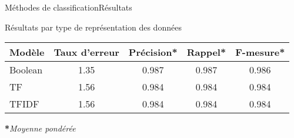 \begin{frame}{Méthodes de classification}{Résultats}
  
  Résultats par type de représentation des données
  
  \begin{center}
    \scriptsize
    \begin{tabular}{l cccc} 
      \hline
      \textbf{Modèle} & \textbf{Taux d'erreur}& \textbf{Précision*} & \textbf{Rappel*} & \textbf{F-mesure*}\\
      \hline
      Boolean & 1.35 & 0.987 & 0.987 & 0.986\\
      TF      & 1.56 & 0.984 & 0.984 & 0.984\\
      TFIDF   & 1.56 & 0.984 & 0.984 & 0.984 \\
    \end{tabular}
  \end{center}    
    \scriptsize\textbf{*}\textit{Moyenne pondérée}

  
\end{frame}
